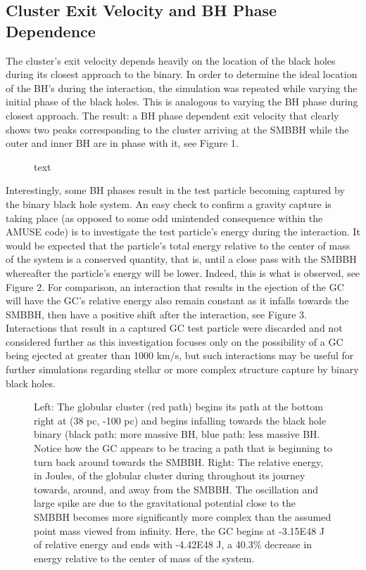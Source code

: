 \documentclass{aastex62}
\begin{document}
\subsection{Cluster Exit Velocity and BH Phase Dependence}
The cluster's exit velocity depends heavily on the location of the black holes during its closest approach to the binary. In order to determine the ideal location of the BH's during the interaction, the simulation was repeated while varying the initial phase of the black holes. This is analogous to varying the BH phase during closest approach. The result: a BH phase dependent exit velocity that clearly shows two peaks corresponding to the cluster arriving at the SMBBH while the outer and inner BH are in phase with it, see Figure 1.
\begin{figure}

\caption{text}
\end{figure}
Interestingly, some BH phases result in the test particle becoming captured by the binary black hole system. An easy check to confirm a gravity capture is taking place (as opposed to some odd unintended consequence within the AMUSE code) is to investigate the test particle's energy during the interaction. It would be expected that the particle's total energy relative to the center of mass of the system is a conserved quantity, that is, until a close pass with the SMBBH whereafter the particle's energy will be lower. Indeed, this is what is observed, see Figure 2. For comparison, an interaction that results in the ejection of the GC will have the GC's relative energy also remain constant as it infalls towards the SMBBH, then have a positive shift after the interaction, see Figure 3. Interactions that result in a captured GC test particle were discarded and not considered further as this investigation focuses only on the possibility of a GC being ejected at greater than 1000 km/s, but such interactions may be useful for further simulations regarding stellar or more complex structure capture by binary black holes.

\begin{figure}

\caption{Left: The globular cluster (red path) begins its path at the bottom right at (38 pc, -100 pc) and begins infalling towards the black hole binary (black path: more massive BH, blue path: less massive BH. Notice how the GC appears to be tracing a path that is beginning to turn back around towards the SMBBH. Right: The relative energy, in Joules, of the globular cluster during throughout its journey towards, around, and away from the SMBBH. The oscillation and large spike are due to the gravitational potential close to the SMBBH becomes more significantly more complex than the assumed point mass viewed from infinity. Here, the GC begins at -3.15E48 J of relative energy and ends with -4.42E48 J, a 40.3\% decrease in energy relative to the center of mass of the system.}
\end{figure}
\end{document}
